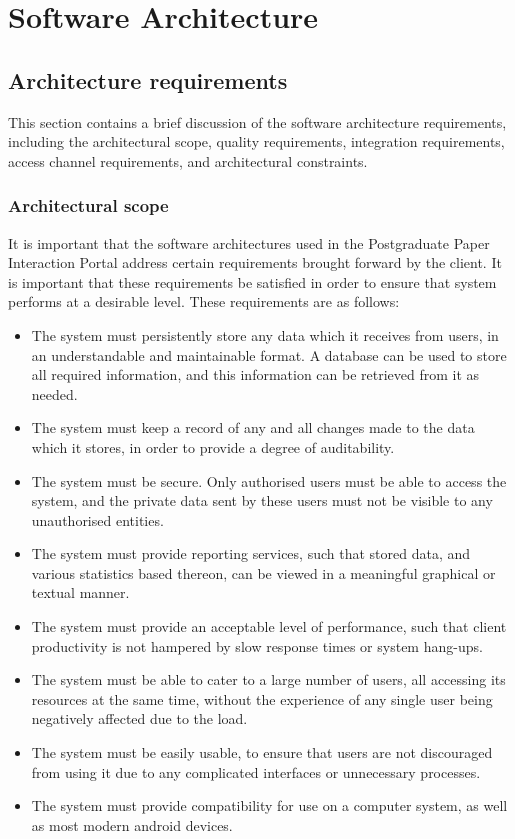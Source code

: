 \documentclass{article}
\begin{document}
\section{Software Architecture}
\subsection{Architecture requirements}
This section contains a brief discussion of the software architecture requirements, including the architectural scope, quality requirements, integration requirements, access channel requirements, and architectural constraints.

	\subsubsection{Architectural scope}
	
	It is important that the software architectures used in the Postgraduate Paper Interaction Portal address certain requirements brought forward by the client. It is important that these requirements be satisfied in order to ensure that system performs at a desirable level. These requirements are as follows:
	
	\begin{itemize}
		\item The system must persistently store any data which it receives from users, in an understandable and maintainable format. A database can be used to store all required information, and this information can be retrieved from it as needed.
		\item The system must keep a record of any and all changes made to the data which it stores, in order to provide a degree of auditability.
		\item The system must be secure. Only authorised users must be able to access the system, and the private data sent by these users must not be visible to any unauthorised entities.
		\item The system must provide reporting services, such that stored data, and various statistics based thereon, can be viewed in a meaningful graphical or textual manner.
		\item The system must provide an acceptable level of performance, such that client productivity is not hampered by slow response times or system hang-ups.
		\item The system must be able to cater to a large number of users, all accessing its resources at the same time, without the experience of any single user being negatively affected due to the load.
		\item The system must be easily usable, to ensure that users are not discouraged from using it due to any complicated interfaces or unnecessary processes.
		\item The system must provide compatibility for use on a computer system, as well as most modern android devices.
	\end{itemize}
\end{document}
